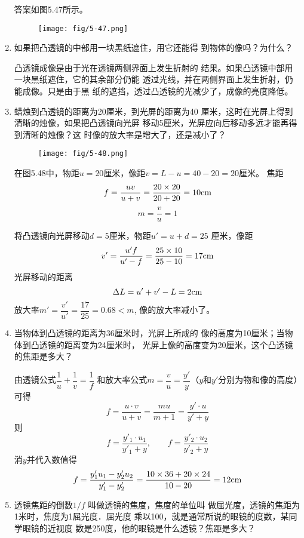 \begin{enumerate}
\begin{solution}
    答案如图5.47所示。
    \begin{figure}[htp]
        \centering
        \texttt{[image: fig/5-47.png]}
        \caption{}
    \end{figure}
\end{solution}
\item 如果把凸透镜的中部用一块黑纸遮住，用它还能得
到物体的像吗？为什么？

\begin{solution}
凸透镜成像是由于光在透镜两侧界面上发生折射的
结果。如果凸透镜中部用一块黑纸遮住，它的其余部分仍能
透过光线，并在两侧界面上发生折射，仍能成像。只是由于黑
纸的遮挡，透过凸透镜的光减少了，成像的亮度降低。
\end{solution}
\item 蜡烛到凸透镜的距离为20厘米，到光屏的距离为40
厘米，这时在光屏上得到清晰的烛像，如果把凸透镜向光屏
移动5厘米，光屏应向后移动多远才能再得到清晰的烛像？这
时像的放大率是增大了，还是减小了？

\begin{solution}
    \begin{figure}[htp]
        \centering
        \texttt{[image: fig/5-48.png]}
        \caption{}
    \end{figure}

    在图5.48中，物距$u=20$厘米，像距$v=L-u=40-20=20$厘米。
    焦距
\[f=\frac{uv}{u+v}=\frac{20\times 20}{20+20}=10{\rm cm}\]
\[m=\frac{v}{u}=1\]

将凸透镜向光屏移动$d=5$厘米，物距$u'=u+d=25$
厘米，像距
\[v'=\frac{u'f}{u'-f}=\frac{25\times 10 }{25-10}=17{\rm cm}\]
光屏移动的距离
\[\Delta L=u'+v'-L=2{\rm cm}\]
放大率$m'=\dfrac{v'}{u'}=\dfrac{17}{25}=0.68<m$, 像的放大率减小了。
\end{solution}
\item 当物体到凸透镜的距离为36厘米时，光屏上所成的
像的高度为10厘米；当物体到凸透镜的距离变为24厘米时，
光屏上像的高度变为20厘米，这个凸透镜的焦距是多大？

\begin{solution}
    由透镜公式$\dfrac{1}{u}+\dfrac{1}{v}=\dfrac{1}{f}$
    和放大率公式$m=\dfrac{v}{u}=\dfrac{y'}{y}$（$y$和$y'$分别为物和像的高度）可得
\[f=\frac{u\cdot v}{u+v}=\frac{mu}{m+1}=\frac{y'\cdot u}{y'+y}\]
则
\[f=\frac{y'_1\cdot u_1}{y'_1+y},\qquad f=\frac{y'_2\cdot u_2}{y'_2+y}\]
消$y$并代入数值得
\[f=\frac{y'_1u_1-y'_2u_2}{y'_1-y'_2}=\frac{10\times 36+20\times 24}{10-20}=12{\rm cm}\]
\end{solution}
\item 透镜焦距的倒数$1/f$
叫做透镜的焦度，焦度的单位叫
做屈光度，透镜的焦距为1米时，焦度为1屈光度．屈光度
乘以100，就是通常所说的眼镜的度数，某同学眼镜的近视度
数是250度，他的眼镜是什么透镜？焦距是多大？


\end{enumerate}
